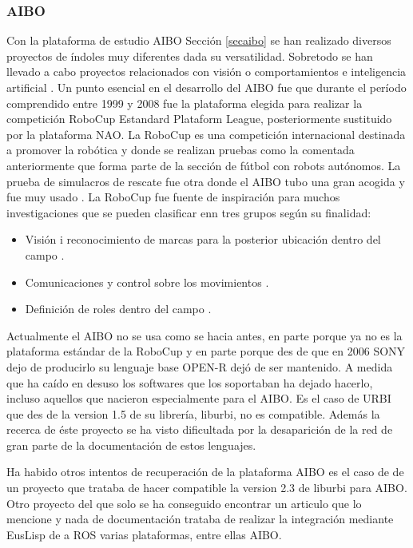 \documentclass[12pt,a4paper,final,twoside]{article}
\begin{document}
\subsubsection{AIBO}

Con la plataforma de estudio AIBO Sección \ref{secaibo} se han realizado diversos proyectos de índoles muy diferentes dada su versatilidad. Sobretodo se han llevado a cabo proyectos relacionados con visión \cite{xavi} o comportamientos e inteligencia artificial \cite{riki}.
Un punto esencial en el desarrollo del AIBO fue que durante el período comprendido entre 1999 y 2008 fue la plataforma elegida para realizar la competición RoboCup Estandard Plataform League, posteriormente sustituido por la plataforma NAO. La RoboCup es una competición internacional destinada a promover la robótica y donde se realizan pruebas como la comentada anteriormente que forma parte de la sección de fútbol con robots autónomos. La prueba de simulacros de rescate fue otra donde el AIBO tubo una gran acogida y fue muy usado \cite{robocup}.
La RoboCup fue fuente de inspiración para muchos investigaciones que se pueden clasificar enn tres grupos según su finalidad:
\begin{itemize}
\item Visión i reconocimiento de marcas para la posterior ubicación dentro del campo \cite{morales}.
\item Comunicaciones y control sobre los movimientos \cite{jesus}.
\item Definición de roles dentro del campo \cite{metod}.
\end{itemize}

Actualmente el AIBO no se usa como se hacia antes, en parte porque ya no es la plataforma estándar de la RoboCup y en parte porque des de que en 2006 SONY dejo de producirlo su lenguaje base OPEN-R dejó de ser mantenido.
A medida que ha caído en desuso los softwares que los soportaban ha dejado hacerlo, incluso aquellos que nacieron especialmente para el AIBO. Es el caso de URBI que des de la version 1.5 de su librería, liburbi, no es compatible.
Además la recerca de éste proyecto se ha visto dificultada por la desaparición de la red de gran parte de la documentación de estos lenguajes.

Ha habido otros intentos de recuperación de la plataforma AIBO es el caso de de un proyecto que trataba de hacer compatible la version 2.3 de liburbi para AIBO.%
Otro proyecto del que solo se ha conseguido encontrar un articulo que lo mencione y nada de documentación  trataba de realizar la integración mediante EusLisp de a ROS varias plataformas, entre ellas AIBO.%
\end{document}
